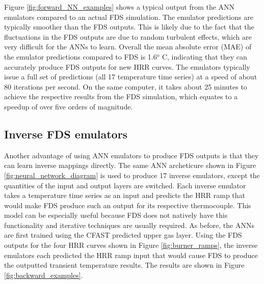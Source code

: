 \documentclass{article}
\begin{document}
Figure \protect\ref{fig:forward_NN_examples} shows a typical output from the ANN emulators compared to an actual FDS simulation. The emulator predictions are typically smoother than the FDS outputs. This is likely due to the fact that the fluctuations in the FDS outputs are due to random turbulent effects, which are very difficult for the ANNs to learn. Overall the mean absolute error (MAE) of the emulator predictions compared to FDS is 1.6$^o$ C, indicating that they can accurately produce FDS outputs for new HRR curves. The emulators typically issue a full set of predictions (all 17 temperature time series) at a speed of about 80 iterations per second. On the same computer, it takes about 25 minutes to achieve the respective results from the FDS simulation, which equates to a speedup of over five orders of magnitude. 
\subsection{Inverse FDS emulators}
Another advantage of using ANN emulators to produce FDS outputs is that they can learn inverse mappings directly. The same ANN archeticure shown in Figure \ref{fig:neural_network_diagram} is used to produce 17 inverse emulators, except the quantities of the input and output layers are switched.  Each inverse emulator takes a temperature time series as an input and predicts the HRR ramp that would make FDS produce such an output for its respective thermocouple. This model can be especially useful because FDS does not natively have this functionality and iterative techniques are usually required. As before, the ANNs are first trained using the CFAST predicted upper gas layer. Using the FDS outputs for the four HRR curves shown in Figure \ref{fig:burner_ramps}, the inverse emulators each predicted the HRR ramp input that would cause FDS to produce the outputted transient temperature results. The results are shown in Figure \ref{fig:backward_examples}.
\end{document}
